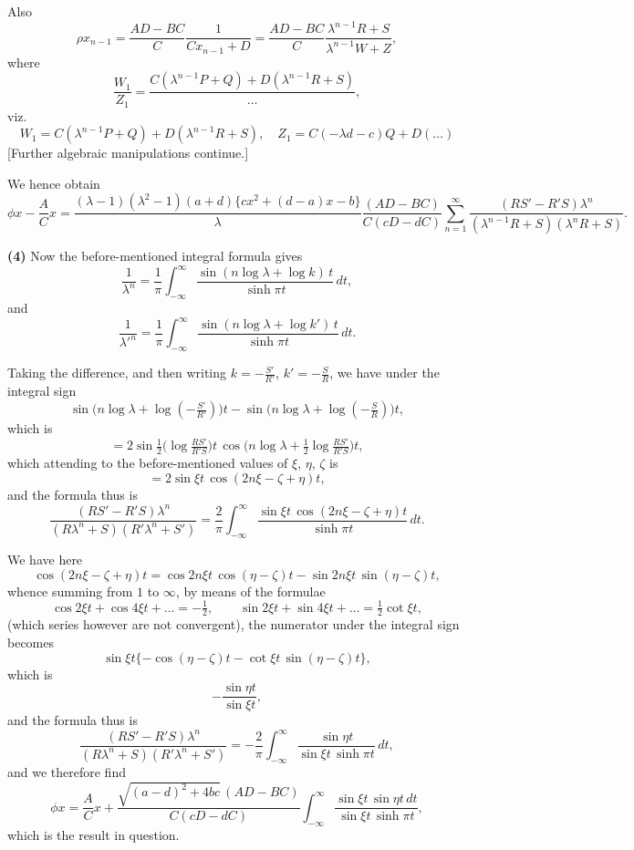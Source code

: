 \documentclass[11pt,a4paper]{book}
\begin{document}
Also
\[
\rho x_{n-1} = \frac{AD - BC}{C}\frac{1}{Cx_{n-1} + D}
= \frac{AD - BC}{C}\frac{\lambda^{n-1}R + S}{\lambda^{n-1}W + Z},
\]
where
\[
\frac{W_1}{Z_1} = \frac{C(\lambda^{n-1}P + Q) + D(\lambda^{n-1}R + S)}{\dots},
\]
viz.
\[
W_1 = C(\lambda^{n-1}P + Q) + D(\lambda^{n-1}R + S),\quad Z_1 = C(-\lambda d - c)Q + D(\dots)
\]
[Further algebraic manipulations continue.]

We hence obtain
\[
\phi x - \frac{A}{C}x = \frac{(\lambda - 1)(\lambda^2 - 1)(a + d)\{cx^2 + (d - a)x - b\}}
{\lambda}\frac{(AD - BC)}{C(cD - dC)}
\sum_{n=1}^{\infty} \frac{(RS' - R'S)\lambda^n}{(\lambda^{n-1}R + S)(\lambda^n R + S)}.
\]

\medskip
\noindent\textbf{(4)}\quad
Now the before-mentioned integral formula gives
\[
\frac{1}{\lambda^n} = \frac{1}{\pi}\int_{-\infty}^{\infty} \frac{\sin(n\log\lambda + \log k)\,t}{\sinh\pi t}\,dt,
\]
and
\[
\frac{1}{\lambda'^n} = \frac{1}{\pi}\int_{-\infty}^{\infty} \frac{\sin(n\log\lambda + \log k')\,t}{\sinh\pi t}\,dt.
\]

Taking the difference, and then writing $k = -\frac{S'}{R'}$, $k' = -\frac{S}{R}$, we have under the integral sign
\[
\sin\bigl(n\log\lambda + \log(-\tfrac{S'}{R'})\bigr)t - \sin\bigl(n\log\lambda + \log(-\tfrac{S}{R})\bigr)t,
\]
which is
\[
= 2\sin\tfrac{1}{2}\bigl(\log\tfrac{RS'}{R'S}\bigr)t\,\cos\bigl(n\log\lambda + \tfrac{1}{2}\log\tfrac{RS'}{R'S}\bigr)t,
\]
which attending to the before-mentioned values of $\xi$, $\eta$, $\zeta$ is
\[
= 2\sin\xi t\,\cos(2n\xi - \zeta + \eta)t,
\]
and the formula thus is
\[
\frac{(RS' - R'S)\lambda^n}{(R\lambda^n + S)(R'\lambda^n + S')}
= \frac{2}{\pi}\int_{-\infty}^{\infty} \frac{\sin\xi t\,\cos(2n\xi - \zeta + \eta)t}{\sinh\pi t}\,dt.
\]

We have here
\[
\cos(2n\xi - \zeta + \eta)t = \cos 2n\xi t\,\cos(\eta - \zeta)t - \sin 2n\xi t\,\sin(\eta - \zeta)t,
\]
whence summing from $1$ to $\infty$, by means of the formulae
\[
\cos 2\xi t + \cos 4\xi t + \dots = -\tfrac{1}{2},\qquad
\sin 2\xi t + \sin 4\xi t + \dots = \tfrac{1}{2}\cot\xi t,
\]
(which series however are not convergent), the numerator under the integral sign becomes
\[
\sin\xi t\{-\cos(\eta - \zeta)t - \cot\xi t\,\sin(\eta - \zeta)t\},
\]
which is
\[
-\frac{\sin\eta t}{\sin\xi t},
\]
and the formula thus is
\[
\frac{(RS' - R'S)\lambda^n}{(R\lambda^n + S)(R'\lambda^n + S')}
= -\frac{2}{\pi}\int_{-\infty}^{\infty} \frac{\sin\eta t}{\sin\xi t\,\sinh\pi t}\,dt,
\]
and we therefore find
\[
\phi x = \frac{A}{C}x + \frac{\sqrt{(a-d)^2 + 4bc}\,(AD - BC)}{C(cD - dC)}
\int_{-\infty}^{\infty} \frac{\sin\xi t\,\sin\eta t\,dt}{\sin\xi t\,\sinh\pi t},
\]
which is the result in question.
\end{document}
